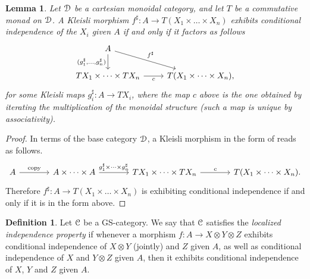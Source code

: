 \documentclass[a4paper,UKenglish,numberwithinsect,cleveref, autoref, thm-restate]{lipics-v2021}
\theoremstyle{plain} %
\newtheorem{mylemma}[mytheorem]{Lemma}
\theoremstyle{definition} %
\newtheorem{mydefinition}[mytheorem]{Definition}
\begin{document}
\begin{mylemma}\label{indepkleisli}
 Let $\mathcal{D}$ be a cartesian monoidal category, and let $T$ be a commutative monad on $\mathcal{D}$.
 A Kleisli morphism $f^\sharp:A\to T(X_1\times\dots\times X_n)$ exhibits conditional independence of the $X_i$ given $A$ if and only if it factors as follows
 \[
 \begin{tikzcd}
  A \ar{d}[swap]{(g_1^\sharp,\dots,g_n^\sharp)} \ar{dr}{f^\sharp} \\
  TX_1\times\dots\times TX_n \ar{r}[swap]{c} & T(X_1\times\dots\times X_n) ,
 \end{tikzcd}
 \]
 for some Kleisli maps $g_i^\sharp:A\to TX_i$,
 where the map $c$ above is the one obtained by iterating the multiplication of the monoidal structure (such a map is unique by associativity). 
\end{mylemma}
\begin{proof}
 In terms of the base category $\mathcal{D}$, a Kleisli morphism in the form of  reads as follows.
 \[
  \begin{tikzcd}[sep=large]
   A \ar{r}{\mathrm{copy}} & A\times\dots\times A \ar{r}{g_1^\sharp\times\dots\times g_n^\sharp} & TX_1\times\dots\times TX_n \ar{r}{c} & T(X_1\times\dots\times X_n) .
  \end{tikzcd}
 \]
 Therefore $f^\sharp:A\to T(X_1\times\dots\times X_n)$ is exhibiting conditional independence if and only if it is in the form above.
\end{proof}



\begin{mydefinition}
 Let $\mathcal{C}$ be a GS-category. We say that $\mathcal{C}$ satisfies the \emph{localized independence property} if whenever a morphism 
 $f:A\to X\otimes Y\otimes Z$ exhibits conditional independence of $X\otimes Y$ (jointly) and $Z$ given $A$, as well as conditional independence of $X$ and $Y\otimes Z$ given $A$, then it exhibits conditional independence of $X$, $Y$ and $Z$ given $A$. 
\end{mydefinition}
\end{document}
